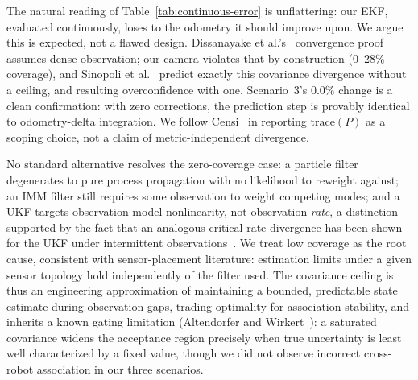 \documentclass[runningheads]{llncs}
\renewcommand{\paragraph}[1]{\vspace{4pt}\noindent{\em #1}\enspace}
\begin{document}
\paragraph{Discussion.}
\label{sec:discussion}
The natural reading of Table~\ref{tab:continuous-error} is
unflattering: our EKF, evaluated continuously, loses to the odometry
it should improve upon. We argue this is expected, not a flawed
design. Dissanayake et al.'s~\cite{dissanayake2001slam} convergence
proof assumes dense observation; our camera violates that by
construction (0--28\% coverage), and Sinopoli et
al.~\cite{sinopoli2004intermittent} predict exactly this covariance
divergence without a ceiling, and resulting overconfidence with one.
Scenario~3's $0.0\%$ change is a clean confirmation: with zero
corrections, the prediction step is provably identical to
odometry-delta integration. We follow
Censi~\cite{censi2009geometric} in reporting $\mathrm{trace}(P)$ as a
scoping choice, not a claim of metric-independent divergence.

No standard alternative resolves the zero-coverage case: a particle
filter degenerates to pure process propagation with no likelihood to
reweight against; an IMM filter still requires some observation to
weight competing modes; and a UKF targets observation-model
nonlinearity, not observation \emph{rate}, a distinction supported by
the fact that an analogous critical-rate divergence has been shown for
the UKF under intermittent observations~\cite{li2012ukf}. We treat
low coverage as the root cause, consistent with sensor-placement
literature: estimation limits under a given sensor topology hold
independently of the filter used. The covariance ceiling is thus an
engineering approximation of maintaining a bounded, predictable state
estimate during observation gaps, trading optimality for association
stability, and inherits a known gating limitation (Altendorfer and
Wirkert~\cite{altendorfer2016association}): a saturated covariance
widens the acceptance region precisely when true uncertainty is least
well characterized by a fixed value, though we did not observe
incorrect cross-robot association in our three scenarios.
\end{document}

